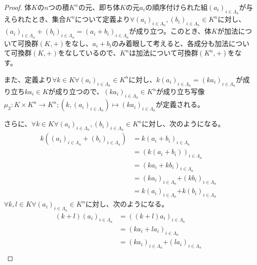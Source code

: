\documentclass[dvipdfmx]{jsarticle}
\begin{document}
\begin{proof}
体$K$の$n$つの積$K^{n}$の元、即ち体$K$の元$a_{i}$の順序付けられた組$\left( a_{i} \right)_{i \in \varLambda_{n}}$が与えられたとき、集合$K^{n}$について定義より$\forall\left( a_{i} \right)_{i \in \varLambda_{n}},\left( b_{i} \right)_{i \in \varLambda_{n}} \in K^{n}$に対し、$\left( a_{i} \right)_{i \in \varLambda_{n}} + \left( b_{i} \right)_{i \in \varLambda_{n}} = \left( a_{i} + b_{i} \right)_{i \in \varLambda_{n}}$が成り立つ。このとき、体$K$が加法について可換群$(K, + )$をなし、$a_{i} + b_{i}$のみ着眼して考えると、各成分も加法について可換群$(K, + )$をなしているので、$K^{n}$は加法について可換群$\left( K^{n}, + \right)$をなす。\par
また、定義より$\forall k \in K\forall\left( a_{i} \right)_{i \in \varLambda_{n}} \in K^{n}$に対し、$k\left( a_{i} \right)_{i \in \varLambda_{n}} = \left( {ka}_{i} \right)_{i \in \varLambda_{n}}$が成り立ち${ka}_{i} \in K$が成り立つので、$\left( {ka}_{i} \right)_{i \in \varLambda_{n}} \in K^{n}$が成り立ち写像$\mu_{2}:K \times K^{n} \rightarrow K^{n};\left( k,\left( a_{i} \right)_{i \in \varLambda_{n}} \right) \mapsto \left( {ka}_{i} \right)_{i \in \varLambda_{n}}$が定義される。\par
さらに、$\forall k \in K\forall\left( a_{i} \right)_{i \in \varLambda_{n}},\left( b_{i} \right)_{i \in \varLambda_{n}} \in K^{n}$に対し、次のようになる。
\begin{align*}
k\left( \left( a_{i} \right)_{i \in \varLambda_{n}} + \left( b_{i} \right)_{i \in \varLambda_{n}} \right) &= k\left( a_{i} + b_{i} \right)_{i \in \varLambda_{n}}\\
&= \left( k\left( a_{i} + b_{i} \right) \right)_{i \in \varLambda_{n}}\\
&= \left( ka_{i} + kb_{i} \right)_{i \in \varLambda_{n}}\\
&= \left( ka_{i} \right)_{i \in \varLambda_{n}}\mathbf{+}\left( kb_{i} \right)_{i \in \varLambda_{n}}\\
&= k\left( a_{i} \right)_{i \in \varLambda_{n}}\mathbf{+}k\left( b_{i} \right)_{i \in \varLambda_{n}}
\end{align*}
$\forall k,l \in K\forall\left( a_{i} \right)_{i \in \varLambda_{n}} \in K^{n}$に対し、次のようになる。
\begin{align*}
(k + l)\left( a_{i} \right)_{i \in \varLambda_{n}} &= \left( (k + l)a_{i} \right)_{i \in \varLambda_{n}}\\
&= \left( ka_{i} + la_{i} \right)_{i \in \varLambda_{n}}\\
&= \left( ka_{i} \right)_{i \in \varLambda_{n}}\mathbf{+}\left( la_{i} \right)_{i \in \varLambda_{n}}\\

\end{align*}
\end{proof}
\end{document}
